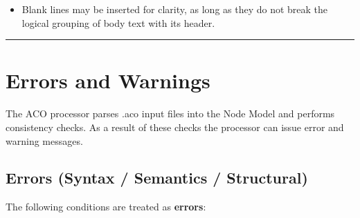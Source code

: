 \documentclass[11pt,twoside,a4paper]{article}
\begin{document}
\begin{itemize}[leftmargin=2em]
  \item Blank lines may be inserted for clarity, as long as they do not break the logical grouping of body text with its header.
\end{itemize}

\bigskip
\hrule
\bigskip

\section{Errors and Warnings}
\label{sec:errors}

The ACO processor parses .aco input files into the Node Model and performs consistency checks.
As a result of these checks the processor can issue error and warning messages.

\subsection{Errors (Syntax / Semantics / Structural)}

The following conditions are treated as \textbf{errors}:
\end{document}
